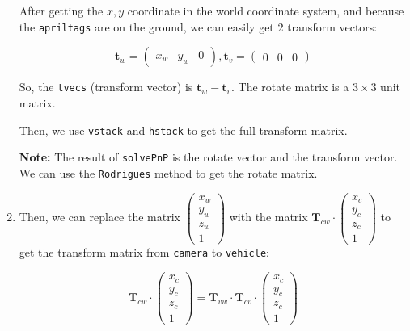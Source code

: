 \documentclass{article}
\begin{document}
\begin{enumerate}
  After getting the $x, y$ coordinate in the world coordinate system, and because the \texttt{apriltags} are on the ground, we can easily get $2$ transform vectors:

  \begin{equation}
    \boldsymbol{t}_{w} = \left(\begin{matrix}x_w&y_w&0\end{matrix}\right), \boldsymbol{t}_{v} = \left(\begin{matrix}0&0&0\end{matrix}\right)
  \end{equation}

  So, the \texttt{tvecs} (transform vector) is $\boldsymbol{t}_{w} - \boldsymbol{t}_{v}$. The rotate matrix is a $3\times3$ unit matrix.

  Then, we use \texttt{vstack} and \texttt{hstack} to get the full transform matrix.

  \textbf{Note:} The result of \texttt{solvePnP} is the rotate vector and the transform vector. We can use the \texttt{Rodrigues} method to get the rotate matrix.

  \item Then, we can replace the matrix $\left(\begin{matrix}x_w\\y_w\\z_w\\1\end{matrix}\right)$ with the matrix $\boldsymbol{T}_{cw}\cdot\left(\begin{matrix}x_c\\y_c\\z_c\\1\end{matrix}\right)$ to get the transform matrix from \texttt{camera} to \texttt{vehicle}:

  \begin{equation}
    \boldsymbol{T}_{cw}\cdot\left(\begin{matrix}x_c\\y_c\\z_c\\1\end{matrix}\right) = \boldsymbol{T}_{vw}\cdot\boldsymbol{T}_{cv}\cdot\left(\begin{matrix}x_c\\y_c\\z_c\\1\end{matrix}\right)
  \end{equation}


\end{enumerate}
\end{document}
